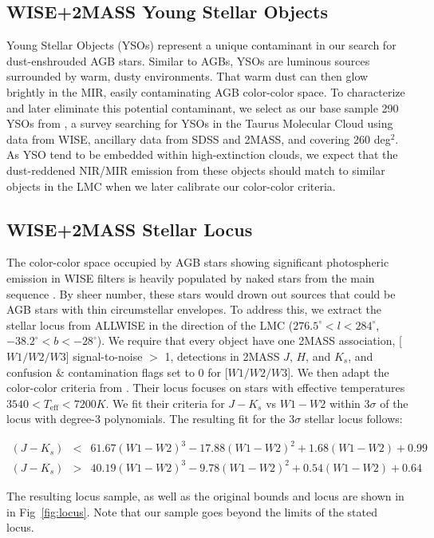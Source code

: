 \subsection{WISE+2MASS Young Stellar Objects}
Young Stellar Objects (YSOs) represent a unique contaminant in our search for dust-enshrouded AGB stars. Similar to AGBs, YSOs are luminous sources surrounded by warm, dusty environments. That warm dust can then glow brightly in the MIR, easily contaminating AGB color-color space. To characterize and later eliminate this potential contaminant, we select as our base sample 290 YSOs from \cite{2011ApJS..196....4R}, a survey searching for YSOs in the Taurus Molecular Cloud using data from WISE, ancillary data from SDSS and 2MASS, and covering 260 deg$^2$. As YSO tend to be embedded within high-extinction clouds, we expect that the dust-reddened NIR/MIR emission from these objects should match to similar objects in the LMC when we later calibrate our color-color criteria.

\subsection{WISE+2MASS Stellar Locus}
The color-color space occupied by AGB stars showing significant photospheric emission in WISE filters is heavily populated by naked stars from the main sequence \citep{2014MNRAS.442.3361N}. By sheer number, these stars would drown out sources that could be AGB stars with thin circumstellar envelopes. To address this, we extract the stellar locus from ALLWISE in the direction of the LMC ($276.5^\circ < l < 284^\circ$, $-38.2^\circ < b < -28^\circ$). We require that every object have one 2MASS association, [$W1/W2/W3$] signal-to-noise $>$ 1, detections in 2MASS $J$, $H$, and $K_s$,  and confusion \& contamination flags set to 0 for [$W1/W2/W3$]. We then adapt the color-color criteria from \cite{2014MNRAS.440.3430D}. Their locus focuses on stars with effective temperatures $3540 < T_\text{eff} < 7200 K$. We fit their criteria for $J-K_s$ vs $W1 - W2$ within 3$\sigma$ of the locus with degree-3 polynomials. The resulting fit for the 3$\sigma$ stellar locus follows:

\begin{eqnarray}
(J - K_s) & < & 61.67(W1-W2)^3 - 17.88(W1-W2)^2 + 1.68(W1-W2) + 0.99\\
(J - K_s) & > & 40.19(W1-W2)^3 - 9.78(W1-W2)^2 + 0.54(W1-W2) + 0.64
\end{eqnarray}

The resulting locus sample, as well as the original \cite{2014MNRAS.440.3430D} bounds and locus are shown in in Fig~\ref{fig:locus}. Note that our sample goes beyond the limits of the stated locus.

